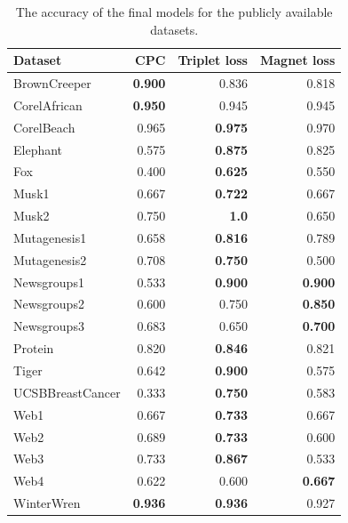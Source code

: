 \begin{table}[h!]
  \centering
  \begin{tabular}{lrrr}
    \toprule
    Dataset          & CPC            & Triplet loss   & Magnet loss \\
    \midrule
    BrownCreeper     & \textbf{0.900} & 0.836          & 0.818 \\
    CorelAfrican     & \textbf{0.950} & 0.945          & 0.945 \\
    CorelBeach       & 0.965          & \textbf{0.975} & 0.970 \\
    Elephant         & 0.575          & \textbf{0.875} & 0.825 \\
    Fox              & 0.400          & \textbf{0.625} & 0.550 \\
    Musk1            & 0.667          & \textbf{0.722} & 0.667 \\
    Musk2            & 0.750          & \textbf{1.0}   & 0.650 \\
    Mutagenesis1     & 0.658          & \textbf{0.816} & 0.789 \\
    Mutagenesis2     & 0.708          & \textbf{0.750} & 0.500 \\
    Newsgroups1      & 0.533          & \textbf{0.900} & \textbf{0.900} \\
    Newsgroups2      & 0.600          & 0.750          & \textbf{0.850} \\
    Newsgroups3      & 0.683          & 0.650          & \textbf{0.700} \\
    Protein          & 0.820          & \textbf{0.846} & 0.821 \\
    Tiger            & 0.642          & \textbf{0.900} & 0.575 \\
    UCSBBreastCancer & 0.333          & \textbf{0.750} & 0.583 \\
    Web1             & 0.667          & \textbf{0.733} & 0.667 \\
    Web2             & 0.689          & \textbf{0.733} & 0.600 \\
    Web3             & 0.733          & \textbf{0.867} & 0.533 \\
    Web4             & 0.622          & 0.600          & \textbf{0.667} \\
    WinterWren       & \textbf{0.936} & \textbf{0.936} & 0.927 \\
    \bottomrule
  \end{tabular}
  \caption{The accuracy of the final models for the publicly available datasets.}\label{tab:toy-accuracy}
\end{table}

